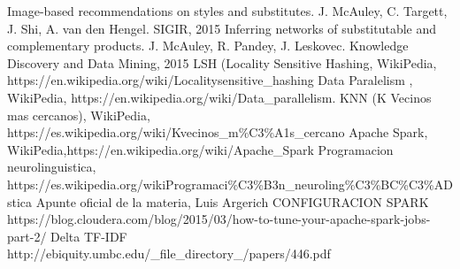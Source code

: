\documentclass[a4paper,10pt]{article}
\begin{document}
	\begin{thebibliography}{99}
		 Image-based recommendations on styles and substitutes. J. McAuley, C. Targett, J. Shi, A. van den Hengel. SIGIR, 2015
		 Inferring networks of substitutable and complementary products. J. McAuley, R. Pandey, J. Leskovec. Knowledge Discovery and Data Mining, 2015
		 LSH (Locality Sensitive Hashing, WikiPedia, https://en.wikipedia.org/wiki/Locality\-sensitive\_hashing
		 Data Paralelism , WikiPedia, https://en.wikipedia.org/wiki/Data\_parallelism.
		 KNN (K Vecinos mas cercanos), WikiPedia, https://es.wikipedia.org/wiki/K\-vecinos\_m\%C3\%A1s\_cercano
		 Apache Spark, WikiPedia,https://en.wikipedia.org/wiki/Apache\_Spark
		 Programacion neurolinguistica, https://es.wikipedia.org/wikiProgramaci\%C3\%B3n\_neuroling\%C3\%BC\%C3\%ADstica
		 Apunte oficial de la materia, Luis Argerich
		 CONFIGURACION SPARK https://blog.cloudera.com/blog/2015/03/how-to-tune-your-apache-spark-jobs-part-2/
		 Delta TF-IDF http://ebiquity.umbc.edu/_file_directory_/papers/446.pdf

	\end{thebibliography}
	
\end{document}
